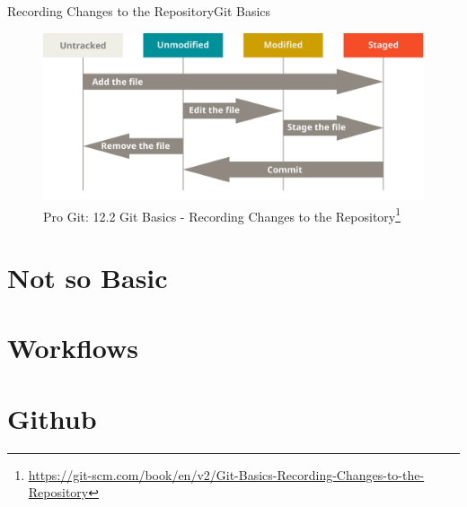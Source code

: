 \documentclass[aspectratio=169]{beamer}
\begin{document}
\begin{frame}{Recording Changes to the Repository}{Git Basics}
\begin{figure}
    \centering
    \includegraphics[width=\textwidth,height=0.6\textheight,keepaspectratio]{lifecycle}
    \caption{
        Pro Git: 12.2 Git Basics - Recording Changes to the Repository\footnote{\url{https://git-scm.com/book/en/v2/Git-Basics-Recording-Changes-to-the-Repository}}
    }
\end{figure}
\end{frame}

\section{Not so Basic}
\section{Workflows}
\section{Github}
\end{document}
